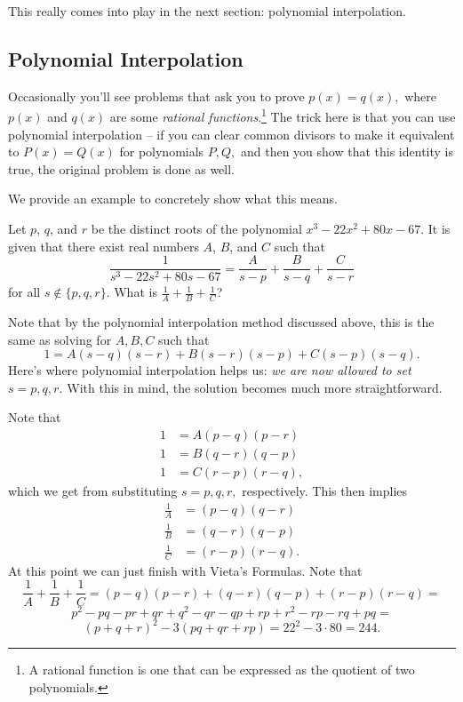 \documentclass[mast]{lucky}
\begin{document}
This really comes into play in the next section: polynomial interpolation.

\subsection{Polynomial Interpolation}

Occasionally you'll see problems that ask you to prove $p(x)=q(x),$ where $p(x)$ and $q(x)$ are some \emph{rational functions}.\footnote{A rational function is one that can be expressed as the quotient of two polynomials.} The trick here is that you can use polynomial interpolation -- if you can clear common divisors to make it equivalent to $P(x)=Q(x)$ for polynomials $P,Q,$ and then you show that this identity is true, the original problem is done as well.

We provide an example to concretely show what this means.

\begin{exam}[AMC 10A 2019/24]
Let $p$, $q$, and $r$ be the distinct roots of the polynomial $x^3 - 22x^2 + 80x - 67$. It is given that there exist real numbers $A$, $B$, and $C$ such that\[\dfrac{1}{s^3 - 22s^2 + 80s - 67} = \dfrac{A}{s-p} + \dfrac{B}{s-q} + \frac{C}{s-r}\]for all $s\not\in\{p,q,r\}$. What is $\tfrac1A+\tfrac1B+\tfrac1C$?
\end{exam}

\begin{sol}
Note that by the polynomial interpolation method discussed above, this is the same as solving for $A,B,C$ such that
\[1=A(s-q)(s-r)+B(s-r)(s-p)+C(s-p)(s-q).\]
Here's where polynomial interpolation helps us: \emph{we are now allowed to set $s=p,q,r$.} With this in mind, the solution becomes much more straightforward.

Note that
\begin{align*}
1&=A(p-q)(p-r) \\
1&=B(q-r)(q-p) \\
1&=C(r-p)(r-q),
\end{align*}
which we get from substituting $s=p,q,r,$ respectively. This then implies
\begin{align*}
\frac{1}{A}&=(p-q)(q-r) \\
\frac{1}{B}&=(q-r)(q-p) \\
\frac{1}{C}&=(r-p)(r-q).
\end{align*}
At this point we can just finish with Vieta's Formulas. Note that
\[\frac{1}{A}+\frac{1}{B}+\frac{1}{C}=(p-q)(p-r)+(q-r)(q-p)+(r-p)(r-q)=\]
\[p^2-pq-pr+qr+q^2-qr-qp+rp+r^2-rp-rq+pq=\]
\[(p+q+r)^2-3(pq+qr+rp)=22^2-3\cdot 80=244.\]
\end{sol}
\end{document}
